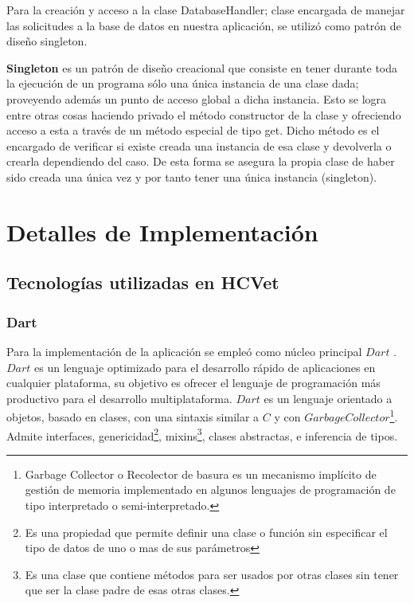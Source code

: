 Para la creación y acceso a la clase DatabaseHandler; clase encargada de manejar las solicitudes a la base de datos en nuestra aplicación, se utilizó como patrón de diseño singleton. 

\textbf{Singleton}  es un patrón de diseño creacional que consiste en tener durante toda la ejecución de un programa sólo una única instancia de una clase dada; proveyendo además un punto de acceso global a dicha instancia. Esto se logra entre otras cosas haciendo privado el método constructor de la clase y ofreciendo acceso a esta a través de un método especial de tipo get. Dicho método es el encargado de verificar si existe creada una instancia de esa clase y devolverla o crearla dependiendo del caso. De esta forma se asegura la propia clase de haber sido creada una única vez y por tanto tener una única instancia (singleton).



\chapter{Detalles de Implementación}
\label{chapter:implementation}


\section{Tecnologías utilizadas en HCVet}


\subsection{Dart}




Para la implementación de la aplicación se empleó como núcleo principal $Dart$ . $Dart$ es un lenguaje optimizado para el desarrollo rápido de aplicaciones en cualquier plataforma, su objetivo es ofrecer el lenguaje de programación más productivo para el desarrollo multiplataforma. $Dart$ es un lenguaje orientado a objetos, basado en clases, con una sintaxis similar a $C$ y con $Garbage Collector$\footnote{Garbage Collector o Recolector de basura es un mecanismo implícito de gestión de memoria implementado en algunos lenguajes de programación de tipo interpretado o semi-interpretado.}. Admite interfaces, genericidad\footnote{Es una propiedad que permite definir una clase o función sin especificar el tipo de datos de uno o mas de sus parámetros }, mixins\footnote{Es una clase que contiene métodos para ser usados por otras clases sin tener que ser la clase padre de esas otras clases. }, clases abstractas,  e inferencia de tipos. 

